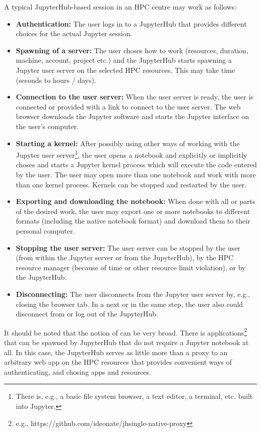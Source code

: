 A typical JupyterHub-based session in an HPC centre may work as follows:
\begin{itemize}
  \item \textbf{Authentication:} The user logs in to a JupyterHub that provides different choices for the actual Jupyter session.
  \item \textbf{Spawning of a server:} The user choses how to work (resources, duration, machine, account, project etc.) and the JupyterHub starts spawning a Jupyter user server on the selected HPC resources.
  This may take time (seconds to hours / days).
  \item \textbf{Connection to the user server:} When the user server is ready, the user is connected or provided with a link to connect to the user server.
  The web browser downloads the Jupyter software and starts the Jupyter interface on the user's computer.
  \item \textbf{Starting a kernel:} After possibly using other ways of working with the Jupyter user server\footnote{There is, e.g., a basic file system browser, a text editor, a terminal, etc. built into Jupyter.}, the user opens a notebook and explicitly or implicitly choses and starts a Jupyter kernel process which will execute the code entered by the user.
  The user may open more than one notebook and work with more than one kernel process.
  Kernels can be stopped and restarted by the user.
  \item \textbf{Exporting and downloading the notebook:} When done with all or parts of the desired work, the user may export one or more notebooks to different formats (including the native notebook format) and download them to their personal computer.
  \item \textbf{Stopping the user server:} The user server can be stopped by the user (from within the Jupyter server or from the JupyterHub), by the HPC resource manager (because of time or other resource limit violation), or by the JupyterHub.
  \item \textbf{Disconnecting:} The user disconnects from the Jupyter user server by, e.g., closing the browser tab.
  In a next or in the same step, the user also could disconnect from or log out of the JupyterHub.
\end{itemize}

It should be noted that the notion of  can be very broad.
There is applications\footnote{e.g., https://github.com/ideonate/jhsingle-native-proxy} that can be spawned by JupyterHub that do not require a Jupyter notebook at all.
In this case, the JupyterHub serves as little more than a proxy to an arbitrary web app on the HPC resources that provides convenient ways of authenticating, and chosing apps and resources.

